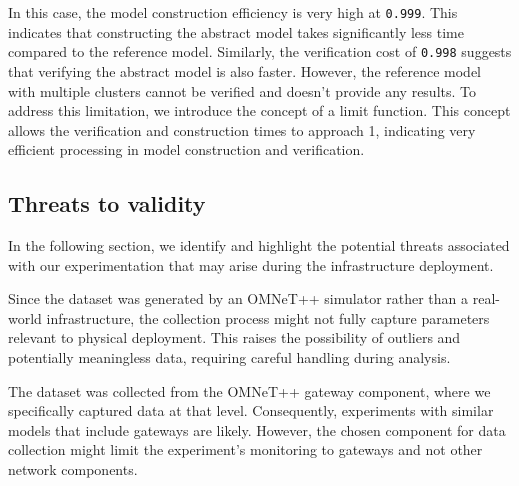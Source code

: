 In this case, the model construction efficiency is very high at \texttt{0.999}. This indicates that constructing the abstract model takes significantly less time compared to the reference model. Similarly, the verification cost of \texttt{0.998} suggests that verifying the abstract model is also faster. However, the reference model with multiple clusters cannot be verified and doesn't provide any results. To address this limitation, we introduce the concept of a limit function. This concept allows the verification and construction times to approach 1, indicating very efficient processing in model construction and verification.


\subsection{Threats to validity}
In the following section, we identify and highlight the potential threats associated with our experimentation that may arise during the infrastructure deployment. 

Since the dataset was generated by an OMNeT++ simulator rather than a real-world infrastructure, the collection process might not fully capture parameters relevant to physical deployment. This raises the possibility of outliers and potentially meaningless data, requiring careful handling during analysis.

The dataset was collected from the OMNeT++ gateway component, where we specifically captured data at that level. Consequently, experiments with similar models that include gateways are likely. However, the chosen component for data collection might limit the experiment's monitoring to gateways and not other network components.
